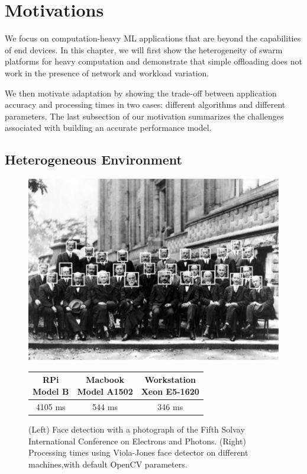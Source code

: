 \section{Motivations}
\label{sec:motivation}

We focus on computation-heavy ML applications that are beyond the capabilities
of end devices. In this chapter, we will first show the heterogeneity of swarm
platforms for heavy computation and demonstrate that simple offloading does not
work in the presence of network and workload variation.

We then motivate adaptation by showing the trade-off between application
accuracy and processing times in two cases: different algorithms and different
parameters. The last subsection of our motivation summarizes the challenges
associated with building an accurate performance model.

\subsection{Heterogeneous Environment}

\begin{figure}
  \begin{minipage}{0.4\textwidth}
    \centering
    \includegraphics[width=.9\textwidth]{figures/physicist.pdf}
    \label{fig:physicist}
  \end{minipage}%
  \begin{minipage}{0.6\textwidth}
    \centering
    \begin{tabular}{c c c}
      \toprule
      \specialcell{RPi\\Model B}
      & \specialcell{Macbook \\ Model A1502}
      & \specialcell{Workstation\\Xeon E5-1620} \\
      \midrule
      4105 ms & 544 ms & 346 ms \\
      \bottomrule
    \end{tabular}
  \end{minipage}
  \caption{(Left) Face detection with a photograph of the Fifth Solvay
    International Conference on Electrons and Photons. (Right) Processing times
    using Viola-Jones face detector on different machines,with default OpenCV
    parameters.}
  \label{fig:capabilities}
\end{figure}

